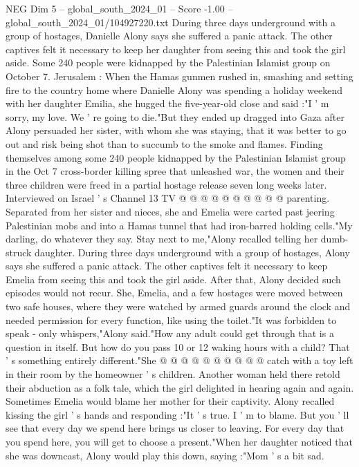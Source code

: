 \begin{textsample}{NEG Dim 5 – global\_south\_2024\_01 – Score -1.00 – global\_south\_2024\_01/104927220.txt}  \label{ex:f5_neg_431}
During three days underground with a group of hostages, Danielle Alony says she suffered a panic attack.
The other captives felt it necessary to keep her daughter from seeing this and took the girl aside.
Some 240 people were kidnapped by the Palestinian Islamist group on October 7.
Jerusalem : When the Hamas gunmen rushed in, smashing and setting fire to the country home where Danielle Alony was spending a holiday weekend with her daughter Emilia, she hugged the five-year-old close and said :"I ' m sorry, my love.
We ' re going to die."But they ended up dragged into Gaza after Alony persuaded her sister, with whom she was staying, that it was better to go out and risk being shot than to succumb to the smoke and flames.
Finding themselves among some 240 people kidnapped by the Palestinian Islamist group in the Oct 7 cross-border killing spree that unleashed war, the women and their three children were freed in a partial hostage release seven long weeks later.
Interviewed on Israel ' s Channel 13 TV @ @ @ @ @ @ @ @ @ @ parenting.
Separated from her sister and nieces, she and Emelia were carted past jeering Palestinian mobs and into a Hamas tunnel that had iron-barred holding cells."My darling, do whatever they say.
Stay next to me,"Alony recalled telling her dumb-struck daughter.
During three days underground with a group of hostages, Alony says she suffered a panic attack.
The other captives felt it necessary to keep Emelia from seeing this and took the girl aside.
After that, Alony decided such episodes would not recur.
She, Emelia, and a few hostages were moved between two safe houses, where they were watched by armed guards around the clock and needed permission for every function, like using the toilet."It was forbidden to speak - only whispers,"Alony said."How any adult could get through that is a question in itself.
But how do you pass 10 or 12 waking hours with a child?
That ' s something entirely different."She @ @ @ @ @ @ @ @ @ @ catch with a toy left in their room by the homeowner ' s children.
Another woman held there retold their abduction as a folk tale, which the girl delighted in hearing again and again.
Sometimes Emelia would blame her mother for their captivity.
Alony recalled kissing the girl ' s hands and responding :"It ' s true.
I ' m to blame.
But you ' ll see that every day we spend here brings us closer to leaving.
For every day that you spend here, you will get to choose a present."When her daughter noticed that she was downcast, Alony would play this down, saying :"Mom ' s a bit sad.

\end{textsample}
